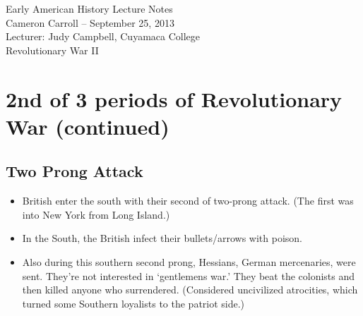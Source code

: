 \documentclass{article}
\begin{document}
  \begin{center}
    {\small{} Early American History Lecture Notes} \\[0.6cm]
    {\small{} Cameron Carroll -- September 25, 2013} \\[0.6cm]
    {\small{} Lecturer: Judy Campbell, Cuyamaca College}\\[1cm]
    {\small{} Revolutionary War II}\\[1cm]
  \end{center}
  
  \tableofcontents
  \newpage
  
  \section{2nd of 3 periods of Revolutionary War (continued)}
    \subsection{Two Prong Attack}
      \begin{itemize}
         \item British enter the south with their second of two-prong attack. (The first was into New York from Long Island.)
         \item In the South, the British infect their bullets/arrows with poison. 
         \item Also during this southern second prong, Hessians, German mercenaries, were sent. They're not interested in `gentlemens war.' They beat the colonists and then killed anyone who surrendered. (Considered uncivilized atrocities, which turned some Southern loyalists to the patriot side.) 
      \end{itemize}
\end{document}
